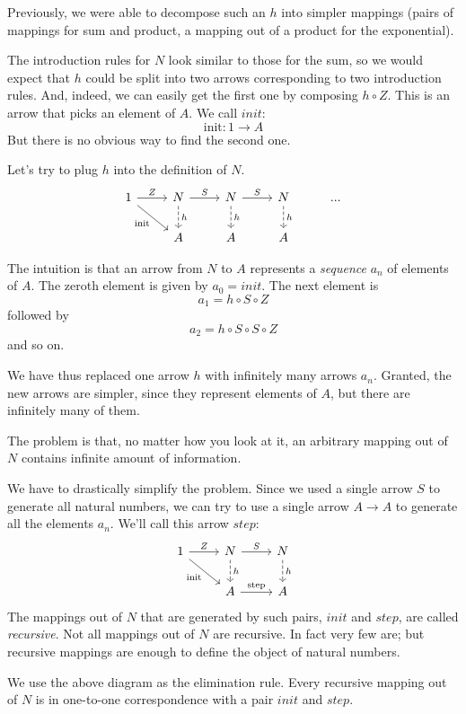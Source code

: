 \documentclass[DaoFP]{subfiles}
\begin{document}
Previously, we were able to decompose such an $h$ into simpler mappings (pairs of mappings for sum and product, a mapping out of a product for the exponential). 

The introduction rules for $N$ look similar to those for the sum, so we would expect that $h$ could be split into two arrows corresponding to two introduction rules. And, indeed, we can easily get the first one by composing $h \circ Z$. This is an arrow that picks an element of $A$. We call $init$:
\[\text{init} \colon 1 \to A \]
But there is no obvious way to find the second one. 


Let's try to plug $h$ into the definition of $N$.
\[
 \begin{tikzcd}
 1
 \arrow[r, "Z"]
 \arrow[rd, "\text{init}"']
 &N
  \arrow[r, "S"]
\arrow[d, dashed, "h"]
&N
  \arrow[r, "S"]
\arrow[d, dashed, "h"]
&N
\arrow[d, dashed, "h"]
& ...
\\
& A
& A
& A
  \end{tikzcd}
\]

The intuition is that an arrow from $N$ to $A$ represents a \emph{sequence} $a_n$ of elements of $A$. The zeroth element is given by $a_0=init$. The next element is
\[a_1 = h \circ S \circ Z \]
followed by
\[a_2 = h \circ S \circ S \circ Z \]
and so on.

We have thus replaced one arrow $h$ with infinitely many arrows $a_n$. Granted, the new arrows are simpler, since they represent elements of $A$, but there are infinitely many of them. 

The problem is that, no matter how you look at it, an arbitrary mapping out of $N$ contains infinite amount of information.

We have to drastically simplify the problem. Since we used a single arrow $S$ to generate all natural numbers, we can try to use a single arrow $A \to A$ to generate all the elements $a_n$. We'll call this arrow $step$:
\[
 \begin{tikzcd}
 1
 \arrow[r, "Z"]
 \arrow[rd, "\text{init}"']
 &N
  \arrow[r, "S"]
\arrow[d, dashed, "h"]
&N
\arrow[d, dashed, "h"]
\\
& A
\arrow[r, "\text{step}"]
& A
  \end{tikzcd}
\]
The mappings out of $N$ that are generated by such pairs, $init$ and $step$, are called \emph{recursive}. Not all mappings out of $N$ are recursive. In fact very few are; but recursive mappings are enough to define the object of natural numbers. 

We use the above diagram as the elimination rule. Every recursive mapping out of $N$ is in one-to-one correspondence with a pair $init$ and $step$. 
\end{document}
